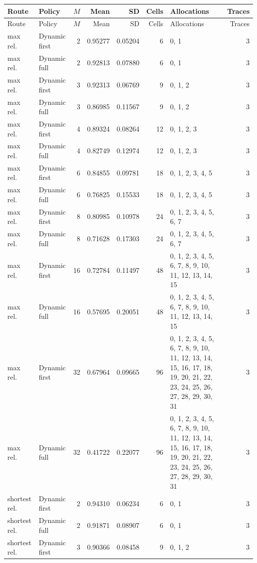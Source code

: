 \documentclass[10pt,a4paper]{article}
\begin{document}
\tiny\setlength{\tabcolsep}{2pt}\begin{longtable}{@{}p{23mm}p{29mm}rrrrp{36mm}r@{}}
\toprule Route & Policy & $M$ & Mean & SD & Cells & Allocations & Traces \\ \midrule\endfirsthead
\toprule Route & Policy & $M$ & Mean & SD & Cells & Allocations & Traces \\ \midrule\endhead
\bottomrule\endfoot
max rel. & Dynamic first & 2 & 0.95277 & 0.05204 & 6 & 0, 1 & 3 \\
max rel. & Dynamic full & 2 & 0.92813 & 0.07880 & 6 & 0, 1 & 3 \\
max rel. & Dynamic first & 3 & 0.92313 & 0.06769 & 9 & 0, 1, 2 & 3 \\
max rel. & Dynamic full & 3 & 0.86985 & 0.11567 & 9 & 0, 1, 2 & 3 \\
max rel. & Dynamic first & 4 & 0.89324 & 0.08264 & 12 & 0, 1, 2, 3 & 3 \\
max rel. & Dynamic full & 4 & 0.82749 & 0.12974 & 12 & 0, 1, 2, 3 & 3 \\
max rel. & Dynamic first & 6 & 0.84855 & 0.09781 & 18 & 0, 1, 2, 3, 4, 5 & 3 \\
max rel. & Dynamic full & 6 & 0.76825 & 0.15533 & 18 & 0, 1, 2, 3, 4, 5 & 3 \\
max rel. & Dynamic first & 8 & 0.80985 & 0.10978 & 24 & 0, 1, 2, 3, 4, 5, 6, 7 & 3 \\
max rel. & Dynamic full & 8 & 0.71628 & 0.17303 & 24 & 0, 1, 2, 3, 4, 5, 6, 7 & 3 \\
max rel. & Dynamic first & 16 & 0.72784 & 0.11497 & 48 & 0, 1, 2, 3, 4, 5, 6, 7, 8, 9, 10, 11, 12, 13, 14, 15 & 3 \\
max rel. & Dynamic full & 16 & 0.57695 & 0.20051 & 48 & 0, 1, 2, 3, 4, 5, 6, 7, 8, 9, 10, 11, 12, 13, 14, 15 & 3 \\
max rel. & Dynamic first & 32 & 0.67964 & 0.09665 & 96 & 0, 1, 2, 3, 4, 5, 6, 7, 8, 9, 10, 11, 12, 13, 14, 15, 16, 17, 18, 19, 20, 21, 22, 23, 24, 25, 26, 27, 28, 29, 30, 31 & 3 \\
max rel. & Dynamic full & 32 & 0.41722 & 0.22077 & 96 & 0, 1, 2, 3, 4, 5, 6, 7, 8, 9, 10, 11, 12, 13, 14, 15, 16, 17, 18, 19, 20, 21, 22, 23, 24, 25, 26, 27, 28, 29, 30, 31 & 3 \\
shortest rel. & Dynamic first & 2 & 0.94310 & 0.06234 & 6 & 0, 1 & 3 \\
shortest rel. & Dynamic full & 2 & 0.91871 & 0.08907 & 6 & 0, 1 & 3 \\
shortest rel. & Dynamic first & 3 & 0.90366 & 0.08458 & 9 & 0, 1, 2 & 3 \\

\end{longtable}
\end{document}
